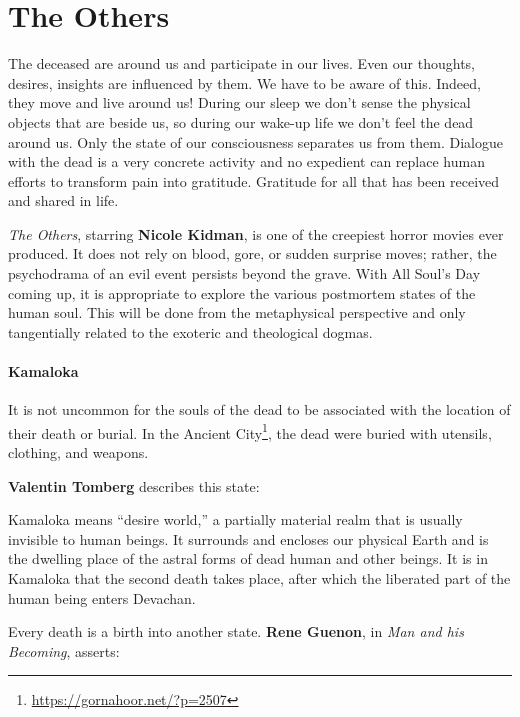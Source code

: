 \section{The Others}

\begin{quotex}
The deceased are around us and participate in our lives. Even our thoughts, desires, insights are influenced by them. We have to be aware of this. Indeed, they move and live around us! During our sleep we don't sense the physical objects that are beside us, so during our wake-up life we don't feel the dead around us. Only the state of our consciousness separates us from them. Dialogue with the dead is a very concrete activity and no expedient can replace human efforts to transform pain into gratitude. Gratitude for all that has been received and shared in life.
\end{quotex}


\emph{The Others}, starring \textbf{Nicole Kidman}, is one of the creepiest horror movies ever produced. It does not rely on blood, gore, or sudden surprise moves; rather, the psychodrama of an evil event persists beyond the grave. With All Soul's Day coming up, it is appropriate to explore the various postmortem states of the human soul. This will be done from the metaphysical perspective and only tangentially related to the exoteric and theological dogmas.

\paragraph{Kamaloka}


It is not uncommon for the souls of the dead to be associated with the location of their death or burial. In the Ancient City\footnote{\url{https://gornahoor.net/?p=2507}}, the dead were buried with utensils, clothing, and weapons.

\textbf{Valentin Tomberg} describes this state:


\begin{quotex}
Kamaloka means ``desire world,'' a partially material realm that is usually invisible to human beings. It surrounds and encloses our physical Earth and is the dwelling place of the astral forms of dead human and other beings. It is in Kamaloka that the second death takes place, after which the liberated part of the human being enters Devachan.
\end{quotex}


Every death is a birth into another state. \textbf{Rene Guenon}, in \emph{Man and his Becoming}, asserts:



